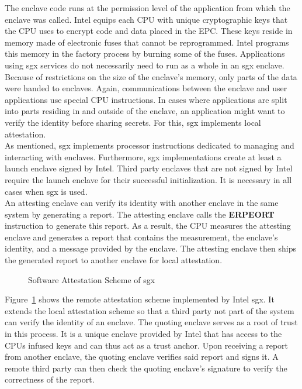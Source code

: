 The enclave code runs at the permission level of the application from which the
enclave was called. Intel equips each CPU with unique cryptographic keys that
the CPU uses to encrypt code and data placed in the EPC. These keys reside in
memory made of electronic fuses that cannot be reprogrammed. Intel programs
this memory in the factory process by burning some of the fuses. Applications
using \gls{sgx} services do not necessarily need to run as a whole in an
\gls{sgx} enclave. Because of restrictions on the size of the enclave's memory,
only parts of the data were handed to enclaves. Again, communications between
the enclave and user applications use special CPU instructions. In cases where
applications are split into parts residing in and outside of the enclave, an
application might want to verify the identity before sharing secrets. For this,
\gls{sgx} implements local attestation.\\

As mentioned, \gls{sgx} implements processor instructions dedicated to managing
and interacting with enclaves. Furthermore, \gls{sgx} implementations create at
least a launch enclave signed by Intel. Third party enclaves that are not signed
by Intel require the launch enclave for their successful initialization. It is
necessary in all cases when \gls{sgx} is used.\\

An attesting enclave can verify its identity with another enclave in the same
system by generating a report. The attesting enclave calls the \textbf{ERPEORT}
instruction to generate this report. As a result, the CPU measures the attesting
enclave and generates a report that contains the measurement, the enclave's
identity, and a message provided by the enclave. The attesting enclave then
ships the generated report to another enclave for local attestation.
\begin{center}
  \begin{figure}
    \centering
    
    \caption{Software Attestation Scheme of \gls{sgx}}
    \label{fig:state:tee:sgx_attestation}
  \end{figure}
\end{center}
Figure~\ref{fig:state:tee:sgx_attestation} shows the remote attestation scheme
implemented by Intel \gls{sgx}. It extends the local attestation scheme so that
a third party not part of the system can verify the identity of an enclave. The
quoting enclave serves as a root of trust in this process. It is a unique
enclave provided by Intel that has access to the CPUs infused keys and can thus
act as a trust anchor. Upon receiving a report from another enclave, the quoting
enclave verifies said report and signs it. A remote third party can then check
the quoting enclave's signature to verify the correctness of the report.

